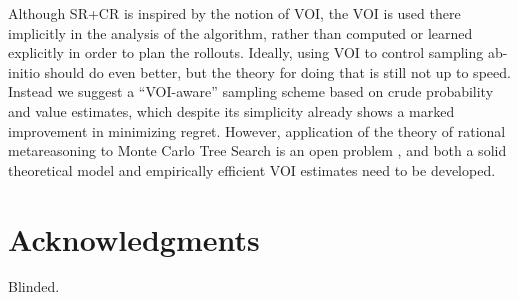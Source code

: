 \documentclass[letterpaper]{article}
\begin{document}
Although SR+CR is inspired  by the notion of VOI,
the VOI is used there implicitly in the analysis of the algorithm,
rather than computed or learned explicitly in order to plan the
rollouts. Ideally, using VOI to control sampling ab-initio should do even better,
but the theory for doing that is still not up to speed. Instead we suggest
a  ``VOI-aware'' sampling scheme based on crude probability and value estimates,
which despite its simplicity already shows a marked improvement in minimizing regret.
However, application of the theory of rational metareasoning
to Monte Carlo Tree Search is an open problem \cite{HayRussell.MCTS},
and both a solid theoretical model and empirically efficient VOI
estimates need to be developed.

\section*{Acknowledgments}

Blinded.




\end{document}
